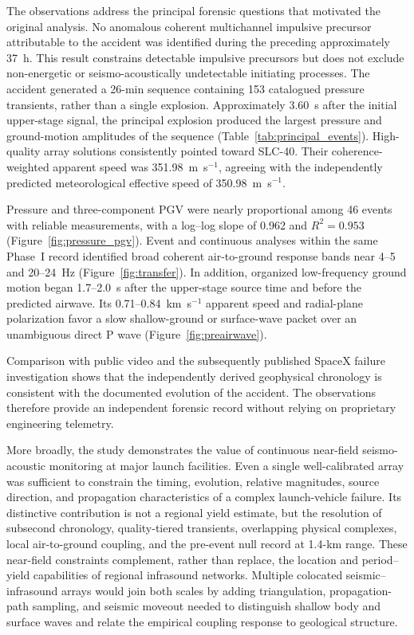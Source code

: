 \documentclass[]{seismica}
\begin{document}
The observations address the principal forensic questions that motivated the
original analysis. No anomalous coherent multichannel impulsive precursor
attributable to the accident was identified during the preceding approximately
37~h. This result constrains detectable impulsive precursors but does not
exclude non-energetic or seismo-acoustically undetectable initiating processes.
The accident generated a 26-min sequence containing 153 catalogued pressure
transients, rather than a single explosion. Approximately 3.60~s after the initial
upper-stage signal, the principal explosion produced the largest pressure and
ground-motion amplitudes of the sequence (Table~\ref{tab:principal_events}).
High-quality array solutions consistently pointed toward SLC-40. Their
coherence-weighted apparent speed was 351.98~m~s$^{-1}$, agreeing with the
independently predicted meteorological effective speed of
350.98~m~s$^{-1}$.

Pressure and three-component PGV were nearly proportional among 46 events with
reliable measurements, with a log--log slope of 0.962 and $R^2=0.953$
(Figure~\ref{fig:pressure_pgv}). Event and continuous analyses within the same
Phase~I record identified broad coherent air-to-ground response bands near
4--5 and 20--24~Hz (Figure~\ref{fig:transfer}). In addition, organized
low-frequency ground motion began 1.7--2.0~s after the upper-stage source time
and before the predicted airwave. Its 0.71--0.84~km~s$^{-1}$ apparent speed and
radial-plane polarization favor a slow shallow-ground or surface-wave packet
over an unambiguous direct P wave (Figure~\ref{fig:preairwave}).

Comparison with public video and the subsequently published SpaceX failure investigation shows that the independently derived geophysical chronology is consistent with the documented evolution of the accident. The observations therefore provide an independent forensic record without relying on proprietary engineering telemetry.

More broadly, the study demonstrates the value of continuous near-field
seismo-acoustic monitoring at major launch facilities. Even a single
well-calibrated array was sufficient to constrain the timing, evolution,
relative magnitudes, source direction, and propagation characteristics of a
complex launch-vehicle failure. Its distinctive contribution is not a regional
yield estimate, but the resolution of subsecond chronology, quality-tiered
transients, overlapping physical complexes, local air-to-ground coupling, and
the pre-event null record at 1.4-km range. These near-field constraints
complement, rather than replace, the location and period--yield capabilities of
regional infrasound networks. Multiple colocated seismic--infrasound arrays
would join both scales by adding triangulation, propagation-path sampling, and
seismic moveout needed to distinguish shallow body and surface waves and relate
the empirical coupling response to geological structure.
\end{document}
